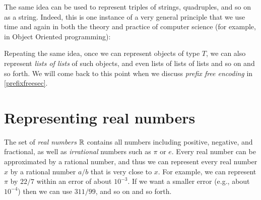 \hypertarget{represnumberbypairs}{}

The same idea can be used to represent triples of strings, quadruples,
and so on as a string. Indeed, this is one instance of a very general
principle that we use time and again in both the theory and practice of
computer science (for example, in Object Oriented programming):

\hypertarget{representtuplesidea}{}

Repeating the same idea, once we can represent objects of type \(T\), we
can also represent \emph{lists of lists} of such objects, and even lists
of lists of lists and so on and so forth. We will come back to this
point when we discuss \emph{prefix free encoding} in
\cref{prefixfreesec}.

\section{Representing real numbers}\label{Representing-real-numbers}

The set of \emph{real numbers} \({\mathbb{R}}\) contains all numbers including
positive, negative, and fractional, as well as \emph{irrational} numbers
such as \(\pi\) or \(e\). Every real number can be approximated by a
rational number, and thus we can represent every real number \(x\) by a
rational number \(a/b\) that is very close to \(x\). For example, we can
represent \(\pi\) by \(22/7\) within an error of about \(10^{-3}\). If
we want a smaller error (e.g., about \(10^{-4}\)) then we can use
\(311/99\), and so on and so forth.


